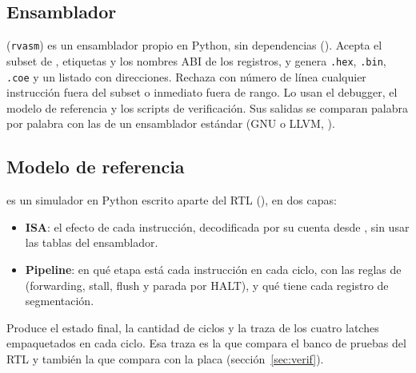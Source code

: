 \subsection{Ensamblador}

 (\texttt{rvasm}) es un ensamblador propio en Python, sin dependencias
(). Acepta el subset de , etiquetas y los nombres ABI de los registros,
y genera \texttt{.hex}, \texttt{.bin}, \texttt{.coe} y un listado con direcciones. Rechaza con
número de línea cualquier instrucción fuera del subset o inmediato fuera de rango. Lo usan el
debugger, el modelo de referencia y los scripts de verificación. Sus salidas se comparan palabra por
palabra con las de un ensamblador estándar (GNU o LLVM, ).

\subsection{Modelo de referencia}

 es un simulador en Python escrito aparte del RTL (), en dos capas:

\begin{itemize}[nosep]
  \item \textbf{ISA}: el efecto de cada instrucción, decodificada por su cuenta desde
        , sin usar las tablas del ensamblador.
  \item \textbf{Pipeline}: en qué etapa está cada instrucción en cada ciclo, con las reglas de
         (forwarding, stall, flush y parada por HALT), y qué tiene cada
        registro de segmentación.
\end{itemize}

Produce el estado final, la cantidad de ciclos y la traza de los cuatro latches empaquetados en
cada ciclo. Esa traza es la que compara el banco de pruebas del RTL y también la que compara
 con la placa (sección~\ref{sec:verif}).
